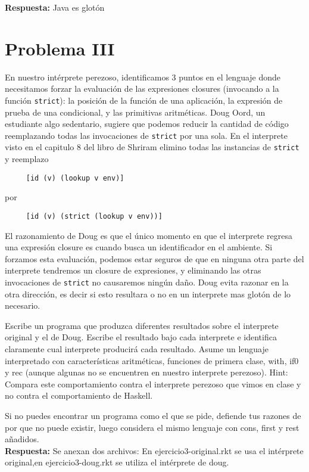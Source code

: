 \documentclass[12pt]{article}
\begin{document}
\textbf{Respuesta: }
Java es glotón


\section*{Problema III}
En nuestro intérprete perezoso, identificamos 3 puntos en el lenguaje donde
necesitamos forzar la evaluación de las expresiones closures (invocando a la
función \texttt{strict}): la posición de la función de una aplicación,
la expresión de prueba de una condicional, y las primitivas aritméticas.
Doug Oord, un estudiante algo sedentario, sugiere que podemos reducir
la cantidad de código reemplazando todas las invocaciones de \texttt{strict}
por una sola. En el interprete visto en el capitulo 8 del libro de Shriram
elimino todas las instancias de \texttt{strict} y reemplazo
\begin{verbatim}
     [id (v) (lookup v env)]
\end{verbatim}

por

\begin{verbatim}
     [id (v) (strict (lookup v env))]
\end{verbatim}

El razonamiento de Doug es que el único momento en que el interprete regresa una
expresión closure es cuando busca un identificador en el ambiente. Si forzamos
esta evaluación, podemos estar seguros de que en ninguna otra parte del interprete
tendremos un closure de expresiones, y eliminando las otras invocaciones de
\texttt{strict} no causaremos ningún daño. Doug evita razonar en la otra dirección,
es decir si esto resultara o no en un interprete mas glotón de lo necesario.

Escribe un programa que produzca diferentes resultados sobre el interprete original
y el de Doug. Escribe el resultado bajo cada interprete e identifica claramente
cual interprete producirá cada resultado. Asume un lenguaje interpretado
con características aritméticas, funciones de primera clase, with, if0 y rec
(aunque algunas no se encuentren en nuestro interprete perezoso). Hint: Compara
este comportamiento contra el interprete perezoso que vimos en clase y no contra
el comportamiento de Haskell.

Si no puedes encontrar un programa como el que se pide, defiende tus razones
de por que no puede existir, luego considera el mismo lenguaje con cons, first
y rest añadidos.
\\

\textbf{Respuesta: } 
Se anexan dos archivos:
En ejercicio3-original.rkt se usa el intérprete original,en ejercicio3-doug.rkt se utiliza el intérprete de doug.
\end{document}
